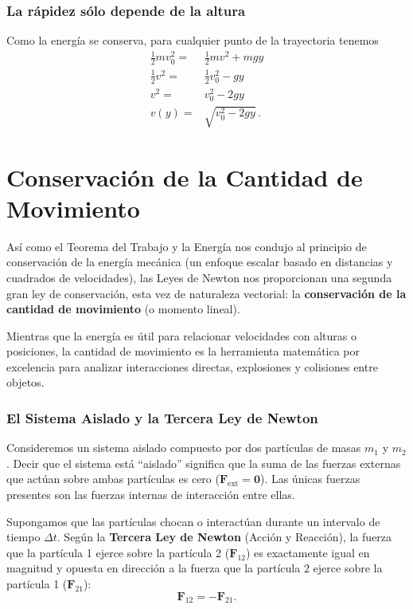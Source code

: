\documentclass[11pt,a4paper]{book}
\begin{document}
\subsubsection{La rápidez sólo depende de la altura}
Como la energía se conserva, para cualquier punto de la trayectoria tenemos
\begin{align}
    \frac{1}{2}m v_0^2=&\frac{1}{2}m v^2 + mgy\nonumber\\
    \frac{1}{2}v^2 =&\frac{1}{2} v_0^2 - gy\nonumber\\
    v^2 =& v_0^2 - 2gy\nonumber\\
    v(y)=&\sqrt{v_0^2-2gy}\,.
\end{align}





\section{Conservación de la Cantidad de Movimiento}

Así como el Teorema del Trabajo y la Energía nos condujo al principio de conservación de la energía mecánica (un enfoque escalar basado en distancias y cuadrados de velocidades), las Leyes de Newton nos proporcionan una segunda gran ley de conservación, esta vez de naturaleza vectorial: la \textbf{conservación de la cantidad de movimiento} (o momento lineal).

Mientras que la energía es útil para relacionar velocidades con alturas o posiciones, la cantidad de movimiento es la herramienta matemática por excelencia para analizar interacciones directas, explosiones y colisiones entre objetos.

\subsubsection{El Sistema Aislado y la Tercera Ley de Newton}

Consideremos un sistema aislado compuesto por dos partículas de masas $m_1$ y $m_2$. Decir que el sistema está ``aislado'' significa que la suma de las fuerzas externas que actúan sobre ambas partículas es cero ($\boldsymbol{F}_{\text{ext}} = \boldsymbol{0}$). Las únicas fuerzas presentes son las fuerzas internas de interacción entre ellas.

Supongamos que las partículas chocan o interactúan durante un intervalo de tiempo $\Delta t$. Según la \textbf{Tercera Ley de Newton} (Acción y Reacción), la fuerza que la partícula 1 ejerce sobre la partícula 2 ($\boldsymbol{F}_{12}$) es exactamente igual en magnitud y opuesta en dirección a la fuerza que la partícula 2 ejerce sobre la partícula 1 ($\boldsymbol{F}_{21}$):
\begin{equation}
    \boldsymbol{F}_{12} = -\boldsymbol{F}_{21}.
    \label{eq:tercera_ley}
\end{equation}
\end{document}
